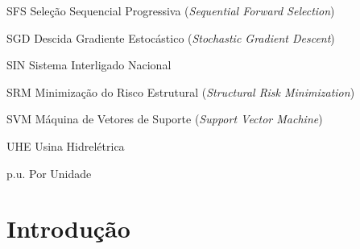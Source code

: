 \documentclass[12pt,oneside,a4paper,chapter=TITLE,section=TITLE,sumario=tradicional,english,brazil]{abntex2}
\begin{document}
\begin{siglas}
  \item[SFS] Seleção Sequencial Progressiva (\textit{Sequential Forward Selection})
  \item[SGD] Descida Gradiente Estocástico (\textit{Stochastic Gradient Descent})
  \item[SIN] Sistema Interligado Nacional
  \item[SRM] Minimização do Risco Estrutural (\textit{Structural Risk Minimization})
  \item[SVM] Máquina de Vetores de Suporte (\textit{Support Vector Machine})
  \item[UHE] Usina Hidrelétrica
  \item[p.u.] Por Unidade
\end{siglas}

 

\tableofcontents*
\cleardoublepage
\textual
	\chapter{Introdução}
\end{document}
